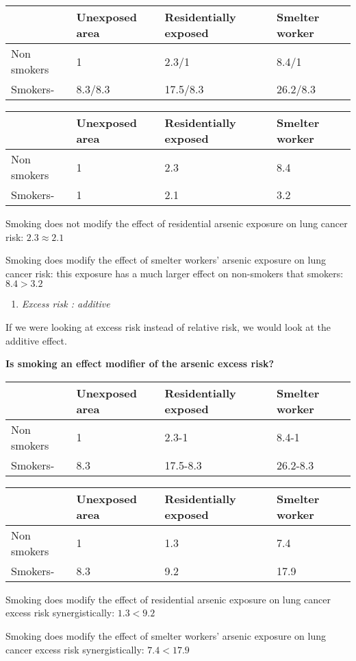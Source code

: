 \documentclass[
]{article}
\providecommand{\tightlist}{%
  \setlength{\itemsep}{0pt}\setlength{\parskip}{0pt}}
\begin{document}
\begin{longtable}[]{@{}llll@{}}
\toprule
& Unexposed area & Residentially exposed & Smelter worker\tabularnewline
\midrule
\endhead
Non smokers & 1 & 2.3/1 & 8.4/1\tabularnewline
Smokers- & 8.3/8.3 & 17.5/8.3 & 26.2/8.3\tabularnewline
\bottomrule
\end{longtable}

\begin{longtable}[]{@{}llll@{}}
\toprule
& Unexposed area & Residentially exposed & Smelter worker\tabularnewline
\midrule
\endhead
Non smokers & 1 & 2.3 & 8.4\tabularnewline
Smokers- & 1 & 2.1 & 3.2\tabularnewline
\bottomrule
\end{longtable}

Smoking does not modify the effect of residential arsenic exposure on
lung cancer risk: \(2.3 \approx 2.1\)

Smoking does modify the effect of smelter workers' arsenic exposure on
lung cancer risk: this exposure has a much larger effect on non-smokers
that smokers: \(8.4 > 3.2\)

\begin{enumerate}
\def\labelenumi{\arabic{enumi}.}
\setcounter{enumi}{1}
\tightlist
\item
  \emph{Excess risk : additive}
\end{enumerate}

If we were looking at excess risk instead of relative risk, we would
look at the additive effect.

\textbf{Is smoking an effect modifier of the arsenic excess risk?}

\begin{longtable}[]{@{}llll@{}}
\toprule
& Unexposed area & Residentially exposed & Smelter worker\tabularnewline
\midrule
\endhead
Non smokers & 1 & 2.3-1 & 8.4-1\tabularnewline
Smokers- & 8.3 & 17.5-8.3 & 26.2-8.3\tabularnewline
\bottomrule
\end{longtable}

\begin{longtable}[]{@{}llll@{}}
\toprule
& Unexposed area & Residentially exposed & Smelter worker\tabularnewline
\midrule
\endhead
Non smokers & 1 & 1.3 & 7.4\tabularnewline
Smokers- & 8.3 & 9.2 & 17.9\tabularnewline
\bottomrule
\end{longtable}

Smoking does modify the effect of residential arsenic exposure on lung
cancer excess risk synergistically: \(1.3 < 9.2\)

Smoking does modify the effect of smelter workers' arsenic exposure on
lung cancer excess risk synergistically: \(7.4 < 17.9\)
\end{document}
